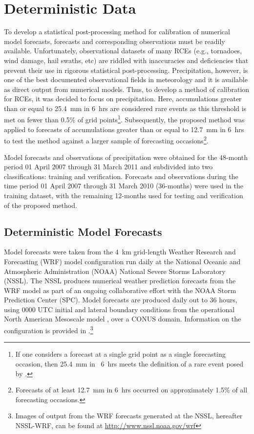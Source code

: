 

\section{Deterministic Data}
\label{ddata}

To develop a statistical post-processing method for calibration of numerical model forecasts, forecasts and corresponding observations must be readily available.
Unfortunately, observational datasets of many RCEs (e.g., tornadoes, wind damage, hail swaths, etc) are riddled with inaccuracies and deficiencies \citep{Doswell1988, Weiss2002, Trapp2006, Ortega2009} that prevent their use in rigorous statistical post-processing.
Precipitation, however, is one of the best documented observational fields in meteorology and it is available as direct output from numerical models.
Thus, to develop a method of calibration for RCEs, it was decided to focus on precipitation.
Here, accumulations greater than or equal to \mbox{25.4 mm} in \mbox{6 hrs} are considered rare events as this threshold is met on fewer than 0.5\% of grid points\footnote{If one considers a forecast at a single grid point as a single forecasting occasion, then \mbox{25.4 mm} in \mbox{ 6 hrs} meets the definition of a rare event posed by \cite{Murphy1991}.}.
Subsequently, the proposed method was applied to forecasts of accumulations greater than or equal to \mbox{12.7 mm} in \mbox{6 hrs} to test the method against a larger sample of forecasting occasions\footnote{Forecasts of at least \mbox{12.7 mm} in \mbox{6 hrs} occurred on approximately 1.5\% of all forecasting occasions.}.

Model forecasts and observations of precipitation were obtained for the 48-month period 01 April 2007 through 31 March 2011 and subdivided into two classifications: training and verification.
Forecasts and observations during the time period 01 April 2007 through 31 March 2010 (36-months) were used in the training dataset, with the remaining 12-months used for testing and verification of the proposed method.




\subsection{Deterministic Model Forecasts}
\label{dmodel}

Model forecasts were taken from the \mbox{4 km} grid-length Weather Research and Forecasting (WRF) model configuration \citep{WRFV3} run daily at the National Oceanic and Atmospheric Administration (NOAA) National Severe Storms Laboratory (NSSL).
The NSSL produces numerical weather prediction forecasts from the WRF model as part of an ongoing collaborative effort with the NOAA Storm Prediction Center (SPC).
Model forecasts are produced daily out to 36 hours, using 0000 UTC initial and lateral boundary conditions from the operational North American Mesoscale model \citep{NAM}, over a CONUS domain.
Information on the configuration is provided in \cite{Kain2010}.\footnote{Images of output from the WRF forecasts generated at the NSSL, hereafter NSSL-WRF, can be found at \url{http://www.nssl.noaa.gov/wrf}}




